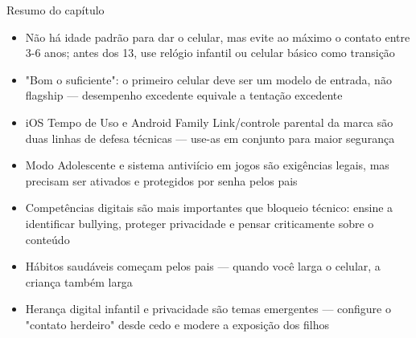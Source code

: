 \begin{tcbsummary}{Resumo do capítulo}
\begin{itemize}
  \item Não há idade padrão para dar o celular, mas evite ao máximo o contato entre 3-6 anos; antes dos 13, use relógio infantil ou celular básico como transição
  \item "Bom o suficiente": o primeiro celular deve ser um modelo de entrada, não flagship — desempenho excedente equivale a tentação excedente
  \item iOS Tempo de Uso e Android Family Link/controle parental da marca são duas linhas de defesa técnicas — use-as em conjunto para maior segurança
  \item Modo Adolescente e sistema antiviício em jogos são exigências legais, mas precisam ser ativados e protegidos por senha pelos pais
  \item Competências digitais são mais importantes que bloqueio técnico: ensine a identificar bullying, proteger privacidade e pensar criticamente sobre o conteúdo
  \item Hábitos saudáveis começam pelos pais — quando você larga o celular, a criança também larga
  \item Herança digital infantil e privacidade são temas emergentes — configure o "contato herdeiro" desde cedo e modere a exposição dos filhos
\end{itemize}

\end{tcbsummary}
